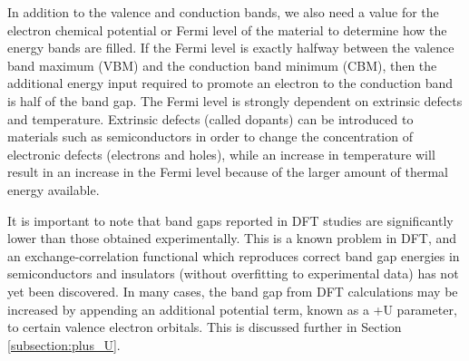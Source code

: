 In addition to the valence and conduction bands, we also need a value for the electron chemical potential or Fermi level of the material to determine how the energy bands are filled. If the Fermi level is exactly halfway between the valence band maximum (VBM) and the conduction band minimum (CBM), then the additional energy input required to promote an electron to the conduction band is half of the band gap. The Fermi level is strongly dependent on extrinsic defects and temperature. Extrinsic defects (called dopants) can be introduced to materials such as semiconductors in order to change the concentration of electronic defects (electrons and holes), while an increase in temperature will result in an increase in the Fermi level because of the larger amount of thermal energy available.

It is important to note that band gaps reported in DFT studies are significantly lower than those obtained experimentally. This is a known problem in DFT, and an exchange-correlation functional which reproduces correct band gap energies in semiconductors and insulators (without overfitting to experimental data) has not yet been discovered. In many cases, the band gap from DFT calculations may be increased by appending an additional potential term, known as a +U parameter, to certain valence electron orbitals. This is discussed further in Section \ref{subsection:plus_U}.






